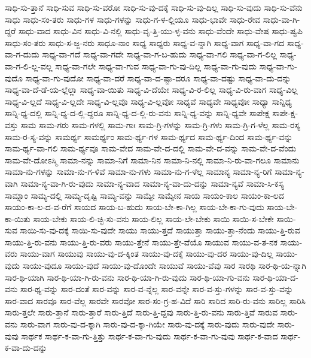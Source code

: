 {ಸಾಧಿ-ಸು-ತ್ತಾನೆ
ಸಾಧಿ-ಸುವ
ಸಾಧಿ-ಸು-ವರೋ
ಸಾಧಿ-ಸು-ವು-ದಕ್ಕೆ
ಸಾಧಿ-ಸು-ವು-ದಿಲ್ಲ
ಸಾಧಿ-ಸು-ವುದು
ಸಾಧಿ-ಸು-ವೆನು
ಸಾಧು
ಸಾಧು-ಸಂ-ತರು
ಸಾಧು-ಗಳ
ಸಾಧು-ಗಳನ್ನು
ಸಾಧು-ಗ-ಳ-ಲ್ಲಿಯೂ
ಸಾಧು-ಭಾವೇ
ಸಾಧು-ರೇವ
ಸಾಧು-ವಾ-ಗಿ-ದ್ದರೆ
ಸಾಧು-ವಾದ
ಸಾಧು-ವಿನ
ಸಾಧು-ವಿ-ನಲ್ಲಿ
ಸಾಧು-ವೃ-ತ್ತಿ-ಯು-ಳ್ಳ-ವನು
ಸಾಧು-ವೆಂದೇ
ಸಾಧು-ವೇಷ
ಸಾಧು-ಷ್ವಪಿ
ಸಾಧು-ಸಂ-ತರು
ಸಾಧು-ಸ-ಜ್ಜ-ನರು
ಸಾಧೂ-ನಾಂ
ಸಾಧ್ಯ
ಸಾಧ್ಯರು
ಸಾಧ್ಯ-ವ-ನ್ನಾಗಿ
ಸಾಧ್ಯ-ವಾಗ
ಸಾಧ್ಯ-ವಾ-ಗದ
ಸಾಧ್ಯ-ವಾ-ಗ-ದುದು
ಸಾಧ್ಯ-ವಾ-ಗದೆ
ಸಾಧ್ಯ-ವಾ-ಗದೇ
ಸಾಧ್ಯ-ವಾ-ಗ-ಬ-ಹುದು
ಸಾಧ್ಯ-ವಾ-ಗಲಿ
ಸಾಧ್ಯ-ವಾ-ಗ-ಲಿಲ್ಲ
ಸಾಧ್ಯ-ವಾ-ಗ-ಲಿ-ಲ್ಲ-ವಲ್ಲ
ಸಾಧ್ಯ-ವಾ-ಗಲೇ
ಸಾಧ್ಯ-ವಾ-ಗುವ
ಸಾಧ್ಯ-ವಾ-ಗು-ವು-ದಿಲ್ಲ
ಸಾಧ್ಯ-ವಾ-ಗು-ವುದು
ಸಾಧ್ಯ-ವಾ-ಗು-ವುದೊ
ಸಾಧ್ಯ-ವಾ-ಗು-ವುದೋ
ಸಾಧ್ಯ-ವಾ-ದರೆ
ಸಾಧ್ಯ-ವಾ-ದ-ಷ್ಟಾ-ದರೂ
ಸಾಧ್ಯ-ವಾ-ದಷ್ಟು
ಸಾಧ್ಯ-ವಾ-ದು-ದನ್ನು
ಸಾಧ್ಯ-ವಾ-ದೆ-ಡೆ-ಯ-ಲ್ಲೆಲ್ಲಾ
ಸಾಧ್ಯ-ವಾ-ಯಿತು
ಸಾಧ್ಯ-ವಿ-ದೆಯೇ
ಸಾಧ್ಯ-ವಿ-ರ-ಲಿಲ್ಲ
ಸಾಧ್ಯ-ವಿ-ರು-ವಾಗ
ಸಾಧ್ಯ-ವಿಲ್ಲ
ಸಾಧ್ಯ-ವಿ-ಲ್ಲದೆ
ಸಾಧ್ಯ-ವಿ-ಲ್ಲದೇ
ಸಾಧ್ಯ-ವಿ-ಲ್ಲವೊ
ಸಾಧ್ಯ-ವಿ-ಲ್ಲವೋ
ಸಾಧ್ಯವೆ
ಸಾಧ್ಯವೇ
ಸಾಧ್ಯವೋ
ಸಾಧ್ಯಾ
ಸಾನ್ನಿಧ್ಯ
ಸಾನ್ನಿ-ಧ್ಯ-ದಲ್ಲಿ
ಸಾನ್ನಿ-ಧ್ಯ-ದ-ಲ್ಲಿ-ದ್ದರೂ
ಸಾನ್ನಿ-ಧ್ಯ-ದ-ಲ್ಲಿ-ರು-ವನು
ಸಾನ್ನಿ-ಧ್ಯ-ವನ್ನು
ಸಾನ್ನಿ-ಧ್ಯವೇ
ಸಾಪೇಕ್ಷ
ಸಾಪೇ-ಕ್ಷ-ವಸ್ತು
ಸಾಮ
ಸಾಮ-ಗರು
ಸಾಮ-ಗಳಲ್ಲಿ
ಸಾಮ-ಗಾಃ
ಸಾಮ-ಗ್ರಿ-ಗಳನ್ನು
ಸಾಮ-ಗ್ರಿ-ಗಳು
ಸಾಮ-ಗ್ರಿ-ಗ-ಳೆಲ್ಲ
ಸಾಮ-ರಸ್ಯ
ಸಾಮ-ರ-ಸ್ಯ-ವನ್ನು
ಸಾಮರ್ಥ್ಯ
ಸಾಮರ್ಥ್ಯಂ
ಸಾಮ-ರ್ಥ್ಯ-ಗಳ
ಸಾಮ-ರ್ಥ್ಯದ
ಸಾಮ-ರ್ಥ್ಯ-ದಿಂದ
ಸಾಮ-ರ್ಥ್ಯ-ವನ್ನು
ಸಾಮ-ರ್ಥ್ಯ-ವಾ-ಗಲಿ
ಸಾಮ-ರ್ಥ್ಯವೂ
ಸಾಮ-ವೇದ
ಸಾಮ-ವೇ-ದ-ದಲ್ಲಿ
ಸಾಮ-ವೇ-ದ-ವನ್ನು
ಸಾಮ-ವೇ-ದ-ವೆಂದು
ಸಾಮ-ವೇ-ದೋಽಸ್ಮಿ
ಸಾಮಾ-ನನ್ನು
ಸಾಮಾ-ನಿಗೆ
ಸಾಮಾ-ನಿನ
ಸಾಮಾ-ನಿ-ನಲ್ಲಿ
ಸಾಮಾ-ನಿ-ರು-ವಾ-ಗಲೂ
ಸಾಮಾನು
ಸಾಮಾ-ನು-ಗಳನ್ನು
ಸಾಮಾ-ನು-ಗ-ಳಿವೆ
ಸಾಮಾ-ನು-ಗಳು
ಸಾಮಾ-ನು-ಗ-ಳೆಲ್ಲ
ಸಾಮಾನ್ಯ
ಸಾಮಾ-ನ್ಯ-ರಿಗೆ
ಸಾಮಾ-ನ್ಯ-ವಾಗಿ
ಸಾಮಾ-ನ್ಯ-ವಾ-ಗಿ-ರು-ವುದು
ಸಾಮಾ-ನ್ಯ-ವಾದ
ಸಾಮಾ-ನ್ಯ-ವಾ-ದು-ದನ್ನು
ಸಾಮಾ-ನ್ಯವೆ
ಸಾಮಾ-ಸಿ-ಕಸ್ಯ
ಸಾಮ್ನಾಂ
ಸಾಮ್ಯ-ದಲ್ಲಿ
ಸಾಮ್ಯ-ದೃಷ್ಟಿ
ಸಾಮ್ಯ-ವನ್ನು
ಸಾಮ್ಯೇ
ಸಾಮ್ಯೇನ
ಸಾಯ
ಸಾಯಂ-ಕಾಲ
ಸಾಯಂ-ಕಾ-ಲದ
ಸಾಯಂ-ಕಾ-ಲ-ದ-ವ-ರೆಗೆ
ಸಾಯದ
ಸಾಯ-ಬ-ಹುದು
ಸಾಯ-ಬೇ-ಕಾ-ಗಿಲ್ಲ
ಸಾಯ-ಬೇ-ಕಾ-ಗು-ವುದು
ಸಾಯ-ಬೇ-ಕಾ-ಯಿತು
ಸಾಯ-ಬೇಕು
ಸಾಯ-ಲಿ-ಚ್ಛಿ-ಸು-ವನು
ಸಾಯ-ಲಿಲ್ಲ
ಸಾಯ-ಲೇ-ಬೇಕು
ಸಾಯಿ
ಸಾಯಿ-ಸ-ಬೇಕೇ
ಸಾಯಿ-ಸುವ
ಸಾಯಿ-ಸು-ವು-ದಕ್ಕೆ
ಸಾಯಿ-ಸು-ವುದೇ
ಸಾಯು
ಸಾಯು-ತ್ತದೆ
ಸಾಯುತ್ತಾ
ಸಾಯು-ತ್ತಾ-ನೆಂದು
ಸಾಯು-ತ್ತಿ-ರುವ
ಸಾಯು-ತ್ತಿ-ರು-ವನು
ಸಾಯು-ತ್ತಿ-ರು-ವರು
ಸಾಯು-ತ್ತೇನೆ
ಸಾಯು-ತ್ತೇ-ವೆಯೊ
ಸಾಯುವ
ಸಾಯು-ವ-ತ-ನಕ
ಸಾಯು-ವರು
ಸಾಯು-ವಾಗ
ಸಾಯುವು
ಸಾಯು-ವು-ದ-ಕ್ಕಿಂತ
ಸಾಯು-ವು-ದಕ್ಕೆ
ಸಾಯು-ವು-ದರ
ಸಾಯು-ವು-ದಿಲ್ಲ
ಸಾಯು-ವುದು
ಸಾಯು-ವುದೂ
ಸಾಯು-ವುದೆ
ಸಾಯು-ವು-ದೊಂದೇ
ಸಾಯುವೆ
ಸಾಯು-ವೆವು
ಸಾರ
ಸಾರಥಿ
ಸಾರ-ಥಿ-ಯ-ನ್ನಾಗಿ
ಸಾರ-ಥಿ-ಯಾಗಿ
ಸಾರ-ಥಿ-ಯಾ-ಗಿ-ರು-ವನು
ಸಾರ-ಥಿ-ಯಾ-ಗಿ-ರು-ವುದು
ಸಾರ-ಥಿ-ಯಾ-ಗು-ವನು
ಸಾರ-ಥಿ-ಯಾ-ದ-ವನು
ಸಾರ-ಥ್ಯ-ವನ್ನು
ಸಾರ-ದಂತೆ
ಸಾರ-ವನ್ನು
ಸಾರ-ವ-ನ್ನೆಲ್ಲ
ಸಾರ-ವನ್ನೇ
ಸಾರ-ವ-ಸ್ತು-ಗಳನ್ನು
ಸಾರ-ವ-ಸ್ತು-ವನ್ನು
ಸಾರ-ವಾದ
ಸಾರವೂ
ಸಾರ-ವೆಲ್ಲ
ಸಾರವೇ
ಸಾರವೋ
ಸಾರ-ಸಂ-ಗ್ರ-ಹ-ವಿದೆ
ಸಾರಿ
ಸಾರಿದ
ಸಾರಿ-ರು-ವನು
ಸಾರಿಲ್ಲ
ಸಾರಿಸಿ
ಸಾರು-ತ್ತಲೇ
ಸಾರು-ತ್ತಾನೆ
ಸಾರು-ತ್ತಾರೆ
ಸಾರು-ತ್ತಿದೆ
ಸಾರು-ತ್ತಿ-ದ್ದವು
ಸಾರು-ತ್ತಿ-ರು-ವನು
ಸಾರು-ತ್ತಿವೆ
ಸಾರುವ
ಸಾರು-ವನು
ಸಾರು-ವಾಗ
ಸಾರು-ವು-ದ-ಕ್ಕಾಗಿ
ಸಾರು-ವು-ದ-ಕ್ಕಾ-ಗಿಯೇ
ಸಾರು-ವು-ದಕ್ಕೆ
ಸಾರು-ವುದು
ಸಾರು-ವುದೇ
ಸಾರು-ವುವು
ಸಾರ್ಥಕ
ಸಾರ್ಥ-ಕ-ವಾ-ಗು-ತ್ತಿತ್ತು
ಸಾರ್ಥ-ಕ-ವಾ-ಗು-ವುದು
ಸಾರ್ಥ-ಕ-ವಾ-ಗು-ವುವು
ಸಾರ್ಥ-ಕ-ವಾದ
ಸಾರ್ಥ-ಕ-ವಾ-ದು-ದನ್ನು
}
